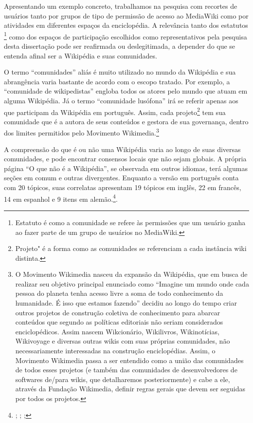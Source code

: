Apresentando um exemplo concreto, trabalhamos na pesquisa com recortes de usuários tanto por grupos de tipo de permissão de acesso ao MediaWiki como por atividades em diferentes espaços da enciclopédia. A relevância tanto dos estatutos \footnote{Estatuto é como a comunidade se refere às permissões que um usuário ganha ao fazer parte de um grupo de usuários no MediaWiki.} como dos espaços de participação escolhidos como representativos pela pesquisa desta dissertação pode ser reafirmada ou deslegitimada, a depender do que se entenda afinal ser a Wikipédia e suas comunidades.

O termo ``comunidades'' aliás é muito utilizado no mundo da Wikipédia e sua abrangência varia bastante de acordo com o escopo tratado. Por exemplo, a ``comunidade de wikipedistas'' engloba todos os atores pelo mundo que atuam em alguma Wikipédia. Já o termo ``comunidade lusófona'' irá se referir apenas aos que participam da Wikipédia em português. Assim, cada projeto\footnote{Projeto" é a forma como as comunidades se referenciam a cada instância wiki distinta.} tem sua comunidade que é a autora de seus conteúdos e gestora de sua governança, dentro dos limites permitidos pelo Movimento Wikimedia.\footnote{O Movimento Wikimedia nasceu da expansão da Wikipédia, que em busca de realizar seu objetivo principal enunciado como ``Imagine um mundo onde cada pessoa do planeta tenha acesso livre a soma de todo conhecimento da humanidade. É isso que estamos fazendo'' decidiu ao longo do tempo criar outros projetos de construção coletiva de conhecimento para abarcar conteúdos que segundo as políticas editoriais não seriam considerados enciclopédicos. Assim nascem Wikcionário, Wikilivros, Wikinotícias, Wikivoyage e diversas outras wikis com suas próprias comunidades, não necessariamente interessadas na construção enciclopédias. Assim, o Movimento Wikimedia passa a ser entendido como a união das comunidades de todos esses projetos (e também das comunidades de desenvolvedores de softwares de/para wikis, que detalharemos posteriormente) e cabe a ele, através da Fundação Wikimedia, definir regras gerais que devem ser seguidas por todos os projetos.}

A compreensão do que é ou não uma Wikipédia varia ao longo de suas diversas comunidades, e pode encontrar consensos locais que não sejam globais. A própria página “O que não é a Wikipédia”, se observada em outros idiomas, terá algumas seções em comum e outras divergentes. Enquanto a versão em português conta com 20 tópicos, suas correlatas apresentam 19 tópicos em inglês, 22 em francês, 14 em espanhol e 9 itens em alemão.\footnote{ ; ; ; }. 

